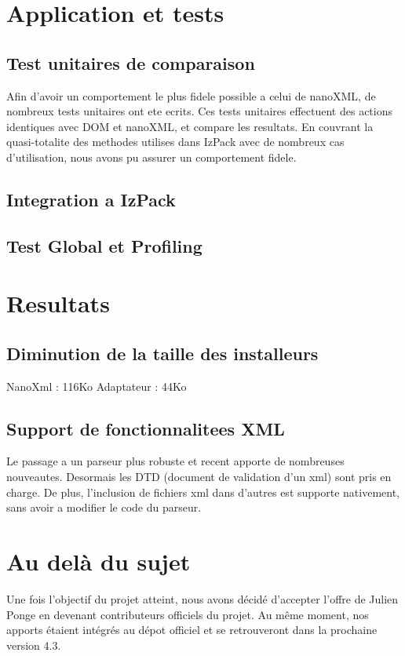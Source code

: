 \section{Application et tests}
\subsection{Test unitaires de comparaison}
Afin d'avoir un comportement le plus fidele possible a celui de nanoXML, de nombreux tests unitaires ont ete ecrits.
Ces tests unitaires effectuent des actions identiques avec DOM et nanoXML, et compare les resultats.
En couvrant la quasi-totalite des methodes utilises dans IzPack avec de nombreux cas d'utilisation, nous avons pu assurer un comportement fidele.
\subsection{Integration a IzPack}
\subsection{Test Global et Profiling}

\section{Resultats}
\subsection{Diminution de la taille des installeurs}
NanoXml : 116Ko
Adaptateur : 44Ko
\subsection{Support de fonctionnalitees XML}
Le passage a un parseur plus robuste et recent apporte de nombreuses nouveautes.
Desormais les DTD (document de validation d'un xml) sont pris en charge.
De plus, l'inclusion de fichiers xml dans d'autres est supporte nativement, sans avoir a modifier le code du parseur.

\section{Au delà du sujet}
Une fois l'objectif du projet atteint, nous avons décidé d'accepter l'offre de Julien Ponge en devenant contributeurs officiels du projet. Au même moment, nos apports étaient intégrés au dépot officiel et se retrouveront dans la prochaine version 4.3.

